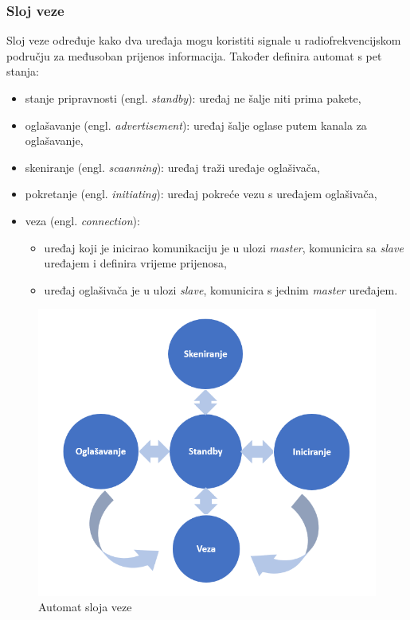 \subsubsection{Sloj veze}
Sloj veze određuje kako dva uređaja mogu koristiti signale u radiofrekvencijskom području za međusoban prijenos informacija. Također definira automat s pet stanja:
\begin{itemize}
	\item stanje pripravnosti (engl. \textit{standby}): uređaj ne šalje niti prima pakete,
	\item oglašavanje (engl. \textit{advertisement}): uređaj šalje oglase putem kanala za oglašavanje,
	\item skeniranje (engl. \textit{scaanning}): uređaj traži uređaje oglašivača,
	\item pokretanje (engl. \textit{initiating}): uređaj pokreće vezu s uređajem oglašivača,
	\item veza (engl. \textit{connection}): 
	\begin{itemize}
		\item uređaj  koji je inicirao komunikaciju je u ulozi \textit{master}, komunicira sa  \textit{slave} uređajem i definira vrijeme prijenosa,
		\item uređaj oglašivača je u ulozi \textit{slave}, komunicira s jednim \textit{master} uređajem.
	\end{itemize}

\end{itemize}

\begin{figure}[ht]
	\centering
	\includegraphics[]{imgs/ll_state_machine}
	\caption{Automat sloja veze \cite{blemanual}}
	\label{fig:ll-state-machine}
\end{figure}

